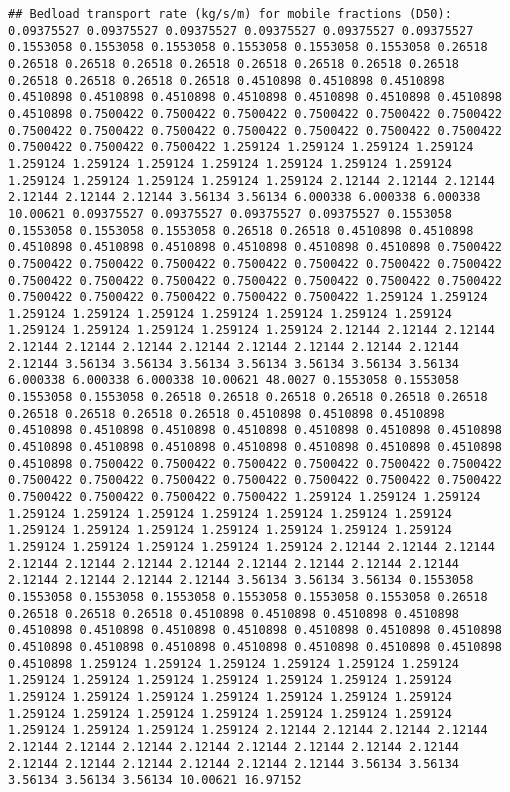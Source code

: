 \documentclass[
]{article}
\begin{document}
\begin{verbatim}
## Bedload transport rate (kg/s/m) for mobile fractions (D50): 0.09375527 0.09375527 0.09375527 0.09375527 0.09375527 0.09375527 0.1553058 0.1553058 0.1553058 0.1553058 0.1553058 0.1553058 0.26518 0.26518 0.26518 0.26518 0.26518 0.26518 0.26518 0.26518 0.26518 0.26518 0.26518 0.26518 0.26518 0.4510898 0.4510898 0.4510898 0.4510898 0.4510898 0.4510898 0.4510898 0.4510898 0.4510898 0.4510898 0.4510898 0.7500422 0.7500422 0.7500422 0.7500422 0.7500422 0.7500422 0.7500422 0.7500422 0.7500422 0.7500422 0.7500422 0.7500422 0.7500422 0.7500422 0.7500422 0.7500422 1.259124 1.259124 1.259124 1.259124 1.259124 1.259124 1.259124 1.259124 1.259124 1.259124 1.259124 1.259124 1.259124 1.259124 1.259124 1.259124 2.12144 2.12144 2.12144 2.12144 2.12144 2.12144 3.56134 3.56134 6.000338 6.000338 6.000338 10.00621 0.09375527 0.09375527 0.09375527 0.09375527 0.1553058 0.1553058 0.1553058 0.1553058 0.26518 0.26518 0.4510898 0.4510898 0.4510898 0.4510898 0.4510898 0.4510898 0.4510898 0.4510898 0.7500422 0.7500422 0.7500422 0.7500422 0.7500422 0.7500422 0.7500422 0.7500422 0.7500422 0.7500422 0.7500422 0.7500422 0.7500422 0.7500422 0.7500422 0.7500422 0.7500422 0.7500422 0.7500422 0.7500422 1.259124 1.259124 1.259124 1.259124 1.259124 1.259124 1.259124 1.259124 1.259124 1.259124 1.259124 1.259124 1.259124 1.259124 2.12144 2.12144 2.12144 2.12144 2.12144 2.12144 2.12144 2.12144 2.12144 2.12144 2.12144 2.12144 3.56134 3.56134 3.56134 3.56134 3.56134 3.56134 3.56134 6.000338 6.000338 6.000338 10.00621 48.0027 0.1553058 0.1553058 0.1553058 0.1553058 0.26518 0.26518 0.26518 0.26518 0.26518 0.26518 0.26518 0.26518 0.26518 0.26518 0.4510898 0.4510898 0.4510898 0.4510898 0.4510898 0.4510898 0.4510898 0.4510898 0.4510898 0.4510898 0.4510898 0.4510898 0.4510898 0.4510898 0.4510898 0.4510898 0.4510898 0.4510898 0.7500422 0.7500422 0.7500422 0.7500422 0.7500422 0.7500422 0.7500422 0.7500422 0.7500422 0.7500422 0.7500422 0.7500422 0.7500422 0.7500422 0.7500422 0.7500422 0.7500422 1.259124 1.259124 1.259124 1.259124 1.259124 1.259124 1.259124 1.259124 1.259124 1.259124 1.259124 1.259124 1.259124 1.259124 1.259124 1.259124 1.259124 1.259124 1.259124 1.259124 1.259124 1.259124 2.12144 2.12144 2.12144 2.12144 2.12144 2.12144 2.12144 2.12144 2.12144 2.12144 2.12144 2.12144 2.12144 2.12144 2.12144 3.56134 3.56134 3.56134 0.1553058 0.1553058 0.1553058 0.1553058 0.1553058 0.1553058 0.1553058 0.26518 0.26518 0.26518 0.26518 0.4510898 0.4510898 0.4510898 0.4510898 0.4510898 0.4510898 0.4510898 0.4510898 0.4510898 0.4510898 0.4510898 0.4510898 0.4510898 0.4510898 0.4510898 0.4510898 0.4510898 0.4510898 0.4510898 1.259124 1.259124 1.259124 1.259124 1.259124 1.259124 1.259124 1.259124 1.259124 1.259124 1.259124 1.259124 1.259124 1.259124 1.259124 1.259124 1.259124 1.259124 1.259124 1.259124 1.259124 1.259124 1.259124 1.259124 1.259124 1.259124 1.259124 1.259124 1.259124 1.259124 1.259124 2.12144 2.12144 2.12144 2.12144 2.12144 2.12144 2.12144 2.12144 2.12144 2.12144 2.12144 2.12144 2.12144 2.12144 2.12144 2.12144 2.12144 2.12144 3.56134 3.56134 3.56134 3.56134 3.56134 10.00621 16.97152
\end{verbatim}
\end{document}
